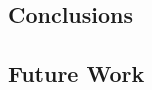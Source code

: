 %

\subsection{Conclusions}
\label{sec:conclusions-main}

\subsection{Future Work}
\label{sec:future-work}

